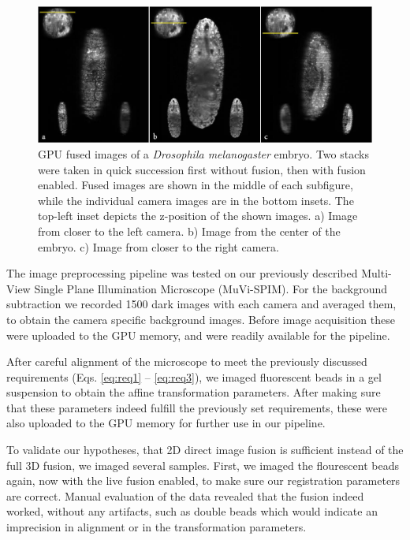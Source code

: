   \begin{figure}[tb]
    \centering
    \includegraphics[width=1\textwidth]{fusion/drosophila_D2}
    \caption{ GPU fused images of a \textit{Drosophila melanogaster} embryo. Two stacks were taken in quick succession first without fusion, then with fusion enabled. Fused images are shown in the middle of each subfigure, while the individual camera images are in the bottom insets. The top-left inset depicts the z-position of the shown images. a) Image from closer to the left camera. b) Image from the center of the embryo. c) Image from closer to the right camera.}
    \label{fig:drosophila}
  \end{figure}

  The image preprocessing pipeline was tested on our previously described Multi-View Single Plane Illumination Microscope (MuVi-SPIM)\cite{krzic_multiview_2012}. For the background subtraction we recorded 1500 dark images with each camera and averaged them, to obtain the camera specific background images. Before image acquisition these were uploaded to the GPU memory, and were readily available for the pipeline.

  After careful alignment of the microscope to meet the previously discussed requirements (Eqs. \eqref{eq:req1} -- \eqref{eq:req3}), we imaged fluorescent beads in a gel suspension to obtain the affine transformation parameters. After making sure that these parameters indeed fulfill the previously set requirements, these were also uploaded to the GPU memory for further use in our pipeline.

  To validate our hypotheses, that 2D direct image fusion is sufficient instead of the full 3D fusion, we imaged several samples. First, we imaged the flourescent beads again, now with the live fusion enabled, to make sure our registration parameters are correct. Manual evaluation of the data revealed that the fusion indeed worked, without any artifacts, such as double beads which would indicate an imprecision in alignment or in the transformation parameters.

